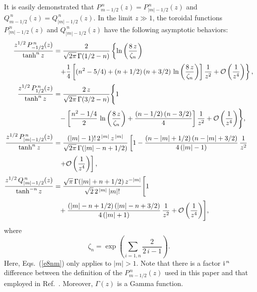 \documentclass[12pt,prb,aps]{revtex4-1}
\begin{document}
It is easily demonstrated that $P_{m-1/2}^{\,n}(z)= P_{|m|-1/2}^{\,n}(z)$
and $Q_{m-1/2}^{\,n}(z) = Q_{|m|-1/2}^{\,n}(z)$.\cite{abram2}
In the limit $z\gg 1$, the toroidal functions $P_{|m|-1/2}^{\,n}(z)$ and $Q_{|m|-1/2}^{\,n}(z)$
have the following asymptotic behaviors:\,\cite{morse2,bate}
\begin{align}
\frac{z^{1/2}\,P_{-1/2}^{\,n}(z)}{\tanh^{n}z}&= \frac{2}{\sqrt{2\pi}\,\Gamma(1/2-n)}
\left\{\ln\left(\frac{8\,z}{\zeta_n}\right)\right.\nonumber\\[0.5ex]
&\phantom{=}\left.
+ \frac{1}{4}\left[(n^2-5/4)+ (n+1/2)\,(n+3/2)\,\ln\left(\frac{8\,z}{\zeta_n}\right)\right]\frac{1}{z^2}+{\cal O}\left(\frac{1}{z^4}\right)\right\},\\[0.5ex]
\frac{z^{1/2}\,P_{1/2}^{\,n}(z)}{\tanh^n z}&= \frac{2\,z}{\sqrt{2\pi}\,\Gamma(3/2-n)}
\Biggl\{1\nonumber\\[0.5ex]&\phantom{=}-\left[\frac{n^2-1/4}{2}\,\ln\left(\frac{8\,z}{\zeta_n}\right)+\frac{(n-1/2)\,(n-3/2)}{4} \right]\frac{1}{z^2}+{\cal O}\left(\frac{1}{z^4}\right)\Biggr\},\\[0.5ex]
\frac{z^{1/2}\,P_{|m|-1/2}^{\,n}(z)}{\tanh^n z}&= \frac{(|m|-1)!\,2^{\,|m|}\,z^{\,|m|}}{\sqrt{2\pi}\,\Gamma(|m|-n+1/2)}
\left[1- \frac{(n-|m|+1/2)\,(n-|m|+3/2)}{4\,(|m|-1)}\,\frac{1}{z^2}\right.\nonumber\\[0.5ex]&\phantom{=}\left.+{\cal O}\left(\frac{1}{z^4}\right)\right],\label{e8nm}\\[0.5ex]
\frac{z^{1/2}\,Q_{|m|-1/2}^{\,n}(z)}{\tanh^{-n}z}&=  \frac{\sqrt{\pi}\,\Gamma(|m|+n+1/2)\,z^{-|m|}}{\sqrt{2}\,2^{\,|m|}\,|m|!}
\Biggl[1\nonumber\\[0.5ex]&\phantom{=}+ \frac{(|m|-n+1/2)\,(|m|-n+3/2)}{4\,(|m|+1)}\,\frac{1}{z^2}+{\cal O}\left(\frac{1}{z^4}\right)\Biggr],\label{e241}
\end{align}
where
\begin{equation}
\zeta_n = \exp\left(\sum_{i=1,n}\frac{2}{2\,i-1}\right).
\end{equation}
Here, Eqs.~(\ref{e8nm}) only applies to $|m|>1$. 
Note that there is a factor ${\rm i}^{\,n}$ difference between the definition of the $P_{m-1/2}^{\,n}(z)$ used in this paper and that employed in Ref.~.
Moreover, $\Gamma(z)$ is a Gamma function.\cite{abram1} 
\end{document}
